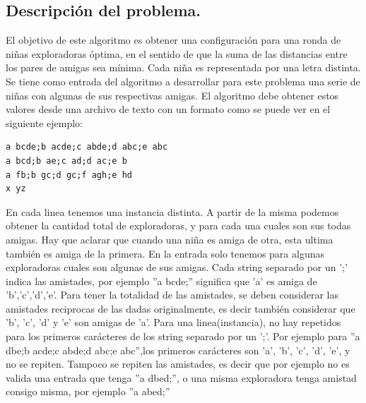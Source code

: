\subsection{Descripción del problema.}





El objetivo de este algoritmo es obtener una configuración para una ronda de niñas exploradoras óptima, en el sentido de que la suma de las distancias entre los pares de amigas sea mínima. Cada niña es representada por una letra distinta. Se tiene como entrada del algoritmo a desarrollar para este problema una serie de niñas con algunas de sus respectivas amigas. El algoritmo debe obtener estos valores desde una archivo de texto con un formato como se puede ver en el siguiente ejemplo:


\begin{verbatim}
a bcde;b acde;c abde;d abc;e abc
a bcd;b ae;c ad;d ac;e b
a fb;b gc;d gc;f agh;e hd
x yz
\end{verbatim}

En cada linea tenemos una instancia distinta. A partir de la misma podemos obtener la cantidad total de exploradoras, y para cada una cuales son sus todas amigas. Hay que aclarar que cuando una niña es amiga de otra, esta ultima también es amiga de la primera. En la entrada solo tenemos para algunas exploradoras cuales son algunas de sus amigas. Cada string separado por un ';' indica las amistades, por ejemplo ''a bcde;'' significa que 'a' es amiga de 'b','c','d','e'. Para tener la totalidad de las amistades, se deben considerar las amistades reciprocas de las dadas originalmente, es decir también considerar que 'b', 'c', 'd' y 'e' son amigas de 'a'. Para una linea(instancia), no hay repetidos para los primeros carácteres de los string separado por un ';'. Por ejemplo para ''a dbe;b acde;c abde;d abc;e abc'',los primeros carácteres son 'a', 'b', 'c', 'd', 'e', y no se repiten. Tampoco se repiten las amistades, es decir que por ejemplo no es valida una entrada que tenga ''a dbed;'', o una misma exploradora tenga amistad consigo misma, por ejemplo ''a abed;''

